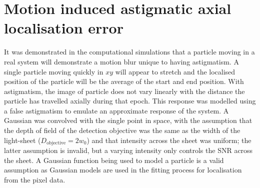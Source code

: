 \section{Motion induced astigmatic axial localisation error}\label{sec:spt_maths}

It was demonstrated in the computational simulations that a particle moving in a real system will demonstrate a motion blur unique to having astigmatism.
A single particle moving quickly in $xy$ will appear to stretch and the localised position of the particle will be the average of the start and end position.
With astigmatism, the image of particle does not vary linearly with the distance the particle has travelled axially during that epoch.
This response was modelled %
using
a false astigmatism %
to emulate an approximate response of the system.
A Gaussian was convolved with the single point in space, with the assumption that the depth of field of the detection objective was the same as the width of the light-sheet (\(D_{\text{objective}}=2w_0\)) and that intensity across the sheet was uniform;
the latter assumption is invalid, but a varying intensity only controls the SNR across the sheet.
A Gaussian function being used to model a particle is a valid assumption as Gaussian models are used in the fitting process for localisation from the pixel data.

